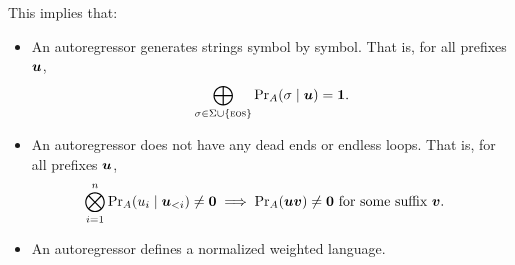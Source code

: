 \documentclass[acmsmall,screen,review,anonymous,nonacm]{PLDI/acmart}
\begin{document}
This implies that:
\begin{itemize}
\item An autoregressor generates strings symbol by symbol. That is, for all prefixes $\stru$, %
\begin{equation}
\bigoplus_{\sym \in \alphabet\cup\{\eos\}} \symprob{\autoregressor}{\stru}{\sym} = \one. \label{eq:sym_probability}
\end{equation}
\item An autoregressor does not have any dead ends or endless loops. That is, for all prefixes $\stru$,
\begin{align}
\bigotimes_{i=1}^n \symprob{\autoregressor}{\stru_{<i}}{u_i} \ne \zero &\implies  \strprob{\autoregressor}{\stru\strv} \ne \zero~\text{for some suffix $\strv$.}
\end{align}
\item An autoregressor defines a normalized weighted language.
\end{itemize}





\end{document}
